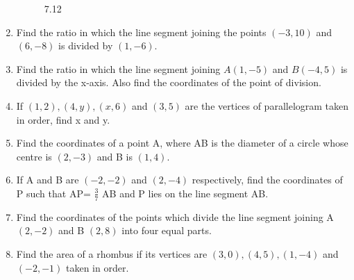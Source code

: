 \documentclass{article}
\theoremstyle{remark}
\begin{document}
\begin{enumerate}
\begin{figure}[ht]
\caption{7.12}
  \label{fig:7.12}
\end{figure}
\item Find the ratio in which the line segment joining the points $(-3,10)$ and $(6,-8)$ is divided by $(1,-6)$.
\item Find the ratio in which the line segment joining $A(1,-5)$ and $B(-4,5)$ is divided by the x-axis. Also find the coordinates of the point of division.
\item If $(1,2), (4,y), (x,6)$ and $(3,5)$ are the vertices of parallelogram taken in order, find x and y.
\item Find the coordinates of a point A, where AB is the diameter of a circle whose centre is $(2,-3)$ and B is $(1,4)$.
\item If A and B are $(-2,-2)$ and $(2,-4)$ respectively, find the coordinates of P such that AP= $\frac {3}{7}$ AB  and P lies on the line segment AB.
\item Find the coordinates of the points which divide the line segment joining A $(2,-2)$ and B $(2,8)$ into four equal parts.
\item Find the area of a rhombus if its vertices are $(3,0), (4,5), (1,-4)$ and $(-2,-1)$ taken in order.
\end{enumerate}
\end{document}
